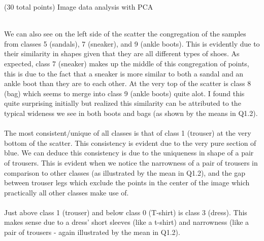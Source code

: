 \documentclass[12pt]{article}
\begin{document}
\begin{question}{(30 total points) Image data analysis with PCA}
\begin{subquestion}
\begin{answerbox}{40em}
{\\
        We can also see on the left side of the scatter the congregation of the samples from classes 5 (sandals), 7 (sneaker), and 9 (ankle boots). This is evidently due to their similarity in shapes given that they are all different types of shoes. As expected, class 7 (sneaker) makes up the middle of this congregation of points, this is due to the fact that a sneaker is more similar to both a sandal and an ankle boot than they are to each other. At the very top of the scatter is class 8 (bag) which seems to merge into class 9 (ankle boots) quite alot. I found this quite surprising initially but realized this similarity can be attributed to the typical wideness we see in both boots and bags (as shown by the means in Q1.2).\\
\\
        The most consistent/unique of all classes is that of class 1 (trouser) at the very bottom of the scatter. This consistency is evident due to the very pure section of blue. We can deduce this consistency is due to the uniqueness in shape of a pair of trousers. This is evident when we notice the narrowness of a pair of trousers in comparison to other classes (as illustrated by the mean in Q1.2), and the gap between trouser legs which exclude the points in the center of the image which practically all other classes make use of.\\
\\
        Just above class 1 (trouser) and below class 0 (T-shirt) is class 3 (dress). This makes sense due to a dress' short sleeves (like a t-shirt) and narrowness (like a pair of trousers - again illustrated by the mean in Q1.2).
        }
      \end{answerbox}
  


   \end{subquestion}
   

\end{question}
\clearpage
%
%
\end{document}
